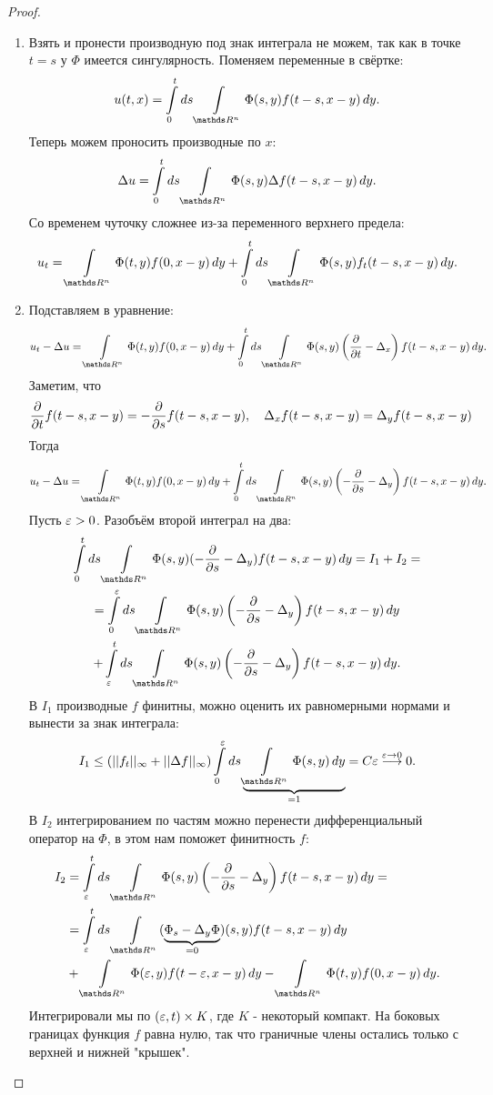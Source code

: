 \begin{proof}

\begin{enumerate}
\item Взять и пронести производную под знак интеграла не можем, так как в точке $t = s$ у $\Phi$ имеется сингулярность. Поменяем переменные в свёртке:
$$ u(t, x) = \int \limits_0^t ds \int \limits_{\real^n} \Phi(s,y) f(t-s, x-y) \,dy.$$
Теперь можем проносить производные по $x$:
$$ \Delta u = \int \limits_0^t ds \int \limits_{\real^n} \Phi(s,y) \Delta f (t-s, x-y) \, dy.$$
Со временем чуточку сложнее из-за переменного верхнего предела:
$$  u_t = \int \limits_{\real^n} \Phi(t,y) f(0, x-y) \, dy + \int \limits_0^t ds \int \limits_{\real^n} \Phi(s,y) f_t(t-s,x-y) \, dy.$$
\item Подставляем в уравнение:
$$ u_t - \Delta u = \int \limits_{\real^n} \Phi(t,y) f(0, x-y) \, dy +  \int \limits_0^t ds \int \limits_{\real^n} \Phi(s,y) \left( \pder{t} - \Delta_x \right) f(t-s, x-y) \, dy.$$
Заметим, что
$$ \frac{\partial}{\partial t} f(t-s,x-y) = - \frac{\partial}{\partial s} f(t-s, x-y), \quad \Delta_x f(t-s, x-y) = \Delta_y f(t-s, x-y)$$
Тогда
$$ u_t - \Delta u = \int \limits_{\real^n} \Phi(t,y) f(0, x-y) \, dy +  \int \limits_0^t ds \int \limits_{\real^n} \Phi(s,y) \left( -\pder{s} - \Delta_y \right) f(t-s, x-y) \, dy.$$
Пусть $\varepsilon > 0$. Разобъём второй интеграл на два:
\begin{gather*}
\int \limits_0^t ds \int \limits_{\real^n} \Phi(s,y) (-\pder{s} - \Delta_y) f(t-s, x-y) \, dy = I_1 + I_2 = \\ 
= \int \limits_0^\eps ds \int \limits_{\real^n} \Phi(s,y) \left(-\pder{s} - \Delta_y \right) f(t-s, x-y) \, dy \\
+ \int \limits_\eps^t ds \int \limits_{\real^n} \Phi(s,y) \left( -\pder{s} - \Delta_y \right) f(t-s, x-y) \, dy.
\end{gather*}
В $I_1$ производные $f$ финитны, можно оценить их равномерными нормами и вынести за знак интеграла:
$$I_1 \leq (|| f_t ||_\infty + || \Delta f ||_\infty) \int \limits_0^\eps ds \underbrace {\int \limits_{\real^n} \Phi(s,y) \, dy }_{=1} = C \eps \stackrel {\eps \to 0} {\longrightarrow} 0. $$
В $I_2$ интегрированием по частям можно перенести дифференциальный оператор на $\Phi$, в этом нам поможет финитность $f$:
\begin{align*}
	I_2 &= \int \limits_\eps^t ds \int \limits_{\real^n} \Phi(s,y) \left( - \pder{s} - \Delta_y \right) f(t-s, x-y) \, dy = \\
	&= \int \limits_\eps^t ds \int \limits_{\real^n} (\underbrace {\Phi_s - \Delta_y\Phi}_{=0})(s,y) f(t-s, x-y) \, dy \\
	& +  \int \limits_{\real^n} \Phi(\eps, y) f(t - \eps, x-y) \, dy - \int \limits_{\real^n} \Phi(t, y) f(0, x-y) \, dy.
\end{align*} 
Интегрировали мы по $(\varepsilon, t) \times K$, где $K$ - некоторый компакт. На боковых границах функция $f$ равна нулю, так что граничные члены остались только с верхней и нижней "крышек".


\end{enumerate}
\end{proof}
